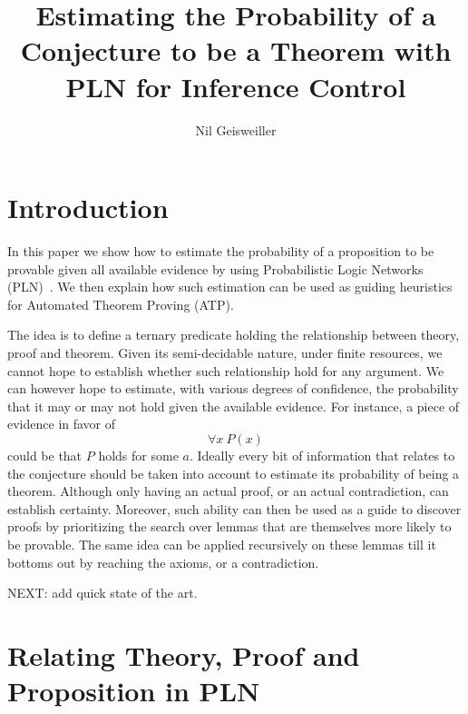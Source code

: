 \documentclass{easychair}
\title{Estimating the Probability of a Conjecture to be a Theorem with
  PLN for Inference Control}
\author{Nil Geisweiller}
\institute{
  SingularityNET Foundation,\\
  Zug, Switzerland\\
  \email{nil@singularitynet.io}
}
\begin{document}
\maketitle


\section{Introduction}

In this paper we show how to estimate the probability of a proposition
to be provable given all available evidence by using Probabilistic
Logic Networks (PLN)~\cite{Goertzel09PLN}.  We then explain how such
estimation can be used as guiding heuristics for Automated Theorem
Proving (ATP).

The idea is to define a ternary predicate holding the relationship
between theory, proof and theorem.  Given its semi-decidable nature,
under finite resources, we cannot hope to establish whether such
relationship hold for any argument.  We can however hope to estimate,
with various degrees of confidence, the probability that it may or may
not hold given the available evidence.  For instance, a piece of
evidence in favor of
$$\forall x \ P(x)$$ could be that $P$ holds for some $a$.  Ideally
every bit of information that relates to the conjecture should be
taken into account to estimate its probability of being a theorem.
Although only having an actual proof, or an actual contradiction, can
establish certainty.  Moreover, such ability can then be used as a
guide to discover proofs by prioritizing the search over lemmas that
are themselves more likely to be provable.  The same idea can be
applied recursively on these lemmas till it bottoms out by reaching
the axioms, or a contradiction.

NEXT: add quick state of the art.

\section{Relating Theory, Proof and Proposition in PLN}
\end{document}
